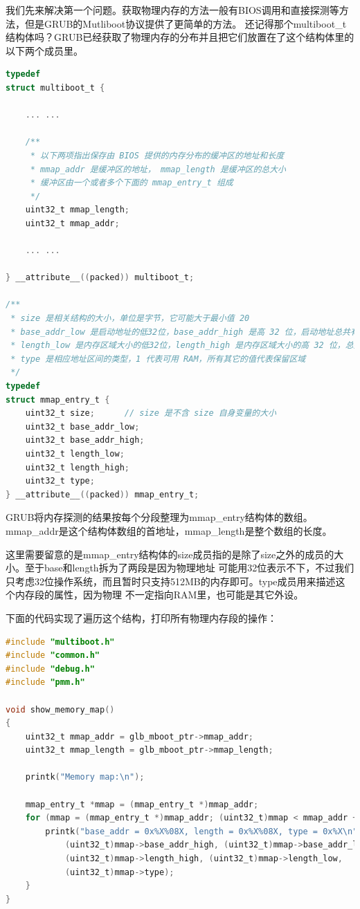 \par 我们先来解决第一个问题。获取物理内存的方法一般有BIOS调用和直接探测等方法，但是GRUB的Mutliboot协议提供了更简单的方法。\allowbreak
还记得那个multiboot\_t结构体吗？GRUB已经获取了物理内存的分布并且把它们放置在了这个结构体里的以下两个成员里。

\begin{lstlisting}[language = C, caption = include/multiboot.h]
typedef
struct multiboot_t {
	
	... ...

	/**
	 * 以下两项指出保存由 BIOS 提供的内存分布的缓冲区的地址和长度
	 * mmap_addr 是缓冲区的地址， mmap_length 是缓冲区的总大小
	 * 缓冲区由一个或者多个下面的 mmap_entry_t 组成
	 */
	uint32_t mmap_length;		
	uint32_t mmap_addr;
	
	... ...

} __attribute__((packed)) multiboot_t;

/**
 * size 是相关结构的大小，单位是字节，它可能大于最小值 20
 * base_addr_low 是启动地址的低32位，base_addr_high 是高 32 位，启动地址总共有 64 位
 * length_low 是内存区域大小的低32位，length_high 是内存区域大小的高 32 位，总共是 64 位
 * type 是相应地址区间的类型，1 代表可用 RAM，所有其它的值代表保留区域
 */
typedef
struct mmap_entry_t {
	uint32_t size; 		// size 是不含 size 自身变量的大小
	uint32_t base_addr_low;
	uint32_t base_addr_high;
	uint32_t length_low;
	uint32_t length_high;
	uint32_t type;
} __attribute__((packed)) mmap_entry_t;
\end{lstlisting}

\par GRUB将内存探测的结果按每个分段整理为mmap\_entry结构体的数组。mmap\_addr是这个结构体数组的首地址，mmap\_length是整个数组的长度。

\par 这里需要留意的是mmap\_entry结构体的size成员指的是除了size之外的成员的大小。至于base和length拆为了两段是因为物理地址\allowbreak
可能用32位表示不下，不过我们只考虑32位操作系统，而且暂时只支持512MB的内存即可。type成员用来描述这个内存段的属性，因为物理\allowbreak
不一定指向RAM里，也可能是其它外设。

\par 下面的代码实现了遍历这个结构，打印所有物理内存段的操作：

\begin{lstlisting}[language = C, caption = mm/pmm.c]
#include "multiboot.h"
#include "common.h"
#include "debug.h"
#include "pmm.h"

void show_memory_map()
{
	uint32_t mmap_addr = glb_mboot_ptr->mmap_addr;
	uint32_t mmap_length = glb_mboot_ptr->mmap_length;

	printk("Memory map:\n");

	mmap_entry_t *mmap = (mmap_entry_t *)mmap_addr;
	for (mmap = (mmap_entry_t *)mmap_addr; (uint32_t)mmap < mmap_addr + mmap_length; mmap++) {
		printk("base_addr = 0x%X%08X, length = 0x%X%08X, type = 0x%X\n",
			(uint32_t)mmap->base_addr_high, (uint32_t)mmap->base_addr_low,
			(uint32_t)mmap->length_high, (uint32_t)mmap->length_low,
			(uint32_t)mmap->type);
	}
}
\end{lstlisting}

